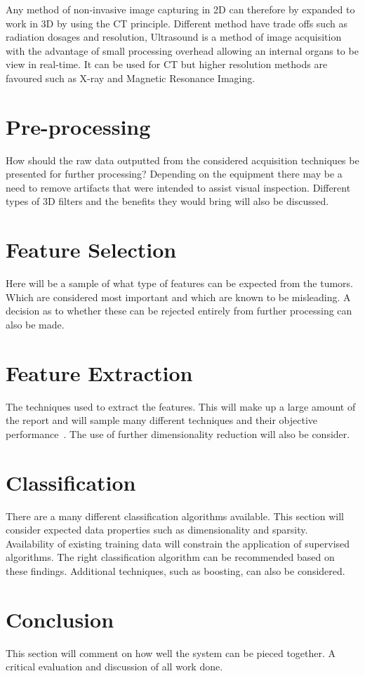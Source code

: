 \documentclass[journal]{IEEEtran}
\begin{document}
Any method of non-invasive image capturing in 2D can therefore by expanded to work in 3D by using the CT principle.
Different method have trade offs such as radiation dosages and resolution,
Ultrasound is a method of image acquisition with the advantage of small processing overhead allowing an internal organs to be view in real-time. 
It can be used for CT but higher resolution methods are favoured such as X-ray and Magnetic Resonance Imaging.



\section{Pre-processing}
\label{sec:PreProcessing}
How should the raw data outputted from the considered acquisition techniques be presented for further processing?
Depending on the equipment there may be a need to remove artifacts that were intended to assist visual inspection. 
Different types of 3D filters and the benefits they would bring will also be discussed.

\section{Feature Selection}
Here will be a sample of what type of features can be expected from the tumors.
Which are considered most important and which are known to be misleading.
A decision as to whether these can be rejected entirely from further processing can also be made. 

\section{Feature Extraction}
\label{FeatureExtraction}

The techniques used to extract the features.
This will make up a large amount of the report and will sample many different techniques and their objective performance~\cite{lohmann1998volumetric}.
The use of further dimensionality reduction will also be consider.


\section{Classification}
\label{Classification}

There are a many different classification algorithms available.
This section will consider expected data properties such as dimensionality and sparsity.
Availability of existing training data will constrain the application of supervised algorithms. 
The right classification algorithm can be recommended based on these findings.
Additional techniques, such as boosting, can also be considered.

\section{Conclusion}
\label{Conclusion}

This section will comment on how well the system can be pieced together.
A critical evaluation and discussion of all work done.




\end{document}
